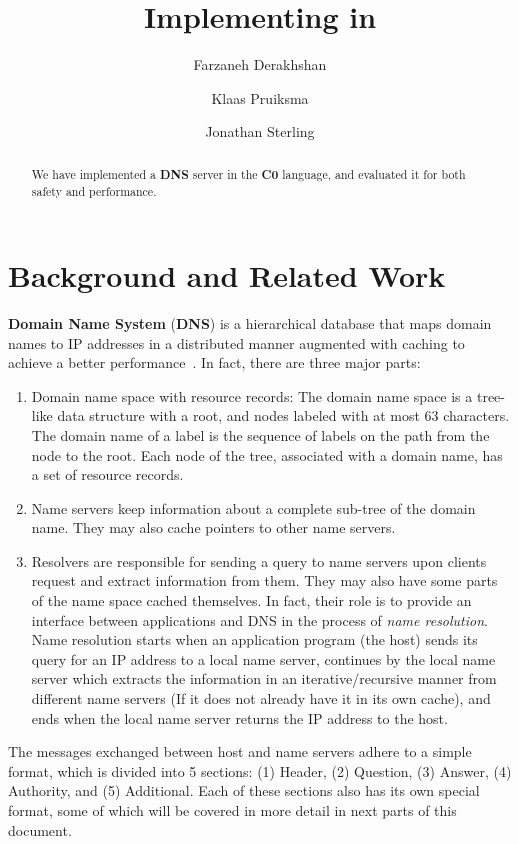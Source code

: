 \documentclass{article}
\title{Implementing \Kwd{DNS} in \Kwd{C0}}
\author{Farzaneh Derakhshan \and Klaas Pruiksma \and Jonathan Sterling}
\newcommand\Kwd[1]{{\sffamily\bfseries{#1}}}
\begin{document}
\maketitle

\begin{abstract}
  We have implemented a \Kwd{DNS} server in the \Kwd{C0} language, and
  evaluated it for both safety and performance.
\end{abstract}

\section{Background and Related Work}


\Kwd{Domain Name System} (\Kwd{DNS}) is a hierarchical database that
maps domain names to IP addresses in a distributed manner augmented
with caching to achieve a better
performance~\cite{rfc:1034,rfc:1035,mun-lee:2005}. In fact, there are
three major parts:

\begin{enumerate}
\item Domain name space with resource records: The domain name space
  is a tree-like data structure with a root, and nodes labeled with at
  most 63 characters. The domain name of a label is the sequence of
  labels on the path from the node to the root. Each node of the tree,
  associated with a domain name, has a set of resource records.

\item Name servers keep information about a complete sub-tree of the
  domain name. They may also cache pointers to other name
  servers.

\item Resolvers are responsible for sending a query to name servers
  upon clients request and extract information from them. They may
  also have some parts of the name space cached themselves.  In fact,
  their role is to provide an interface between applications and DNS
  in the process of \emph{name resolution}. Name resolution starts
  when an application program (the host) sends its query for an IP
  address to a local name server, continues by the local name server
  which extracts the information in an iterative/recursive manner from
  different name servers (If it does not already have it in its own
  cache), and ends when the local name server returns the IP address
  to the host.
\end{enumerate}

The messages exchanged between host and name servers adhere to a
simple format, which is divided into 5 sections: (1) Header, (2)
Question, (3) Answer, (4) Authority, and (5) Additional.  Each of
these sections also has its own special format, some of which will be
covered in more detail in next parts of this document.
\end{document}
